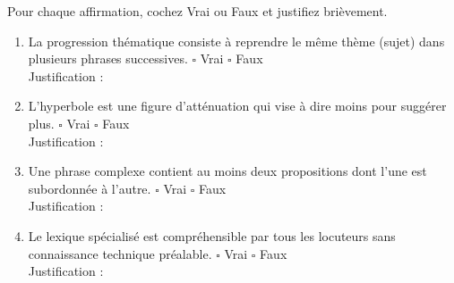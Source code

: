 \documentclass[11pt]{article}
\begin{document}
\begin{exercice}
Pour chaque affirmation, cochez Vrai ou Faux et justifiez brièvement.
\begin{enumerate}
    \item La progression thématique consiste à reprendre le même thème (sujet) dans plusieurs phrases successives. \hfill $\square$ Vrai $\square$ Faux \\
    Justification : \underline{\hspace{12cm}}
    \item L'hyperbole est une figure d'atténuation qui vise à dire moins pour suggérer plus. \hfill $\square$ Vrai $\square$ Faux \\
    Justification : \underline{\hspace{12cm}}
    \item Une phrase complexe contient au moins deux propositions dont l'une est subordonnée à l'autre. \hfill $\square$ Vrai $\square$ Faux \\
    Justification : \underline{\hspace{12cm}}
    \item Le lexique spécialisé est compréhensible par tous les locuteurs sans connaissance technique préalable. \hfill $\square$ Vrai $\square$ Faux \\
    Justification : \underline{\hspace{12cm}}
\end{enumerate}
\end{exercice}
\end{document}
